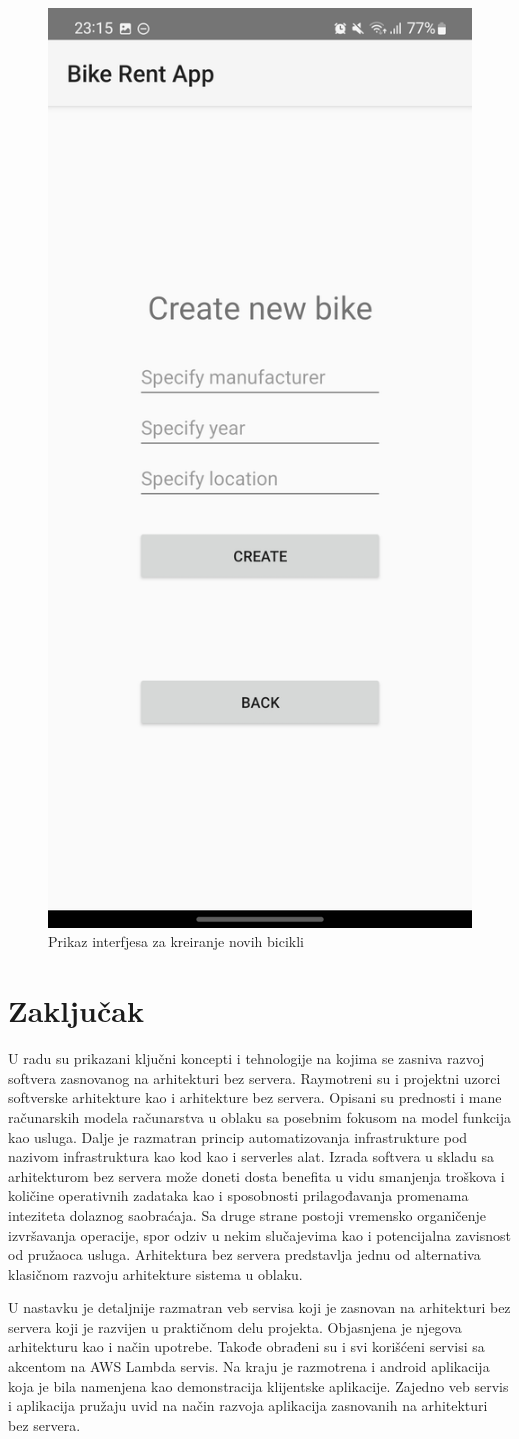 \documentclass[12pt,oneside]{memoir}
\begin{document}
\begin{figure}[!ht]
  \centering
  \includegraphics[height=0.6\textwidth]{Kreiranje nove bicikle.jpg}
  \caption{Prikaz interfjesa za kreiranje novih bicikli}
  \label{fig:kreiranjeNovihBicikli}
\end{figure}


\chapter{Zaključak}

U radu su prikazani ključni koncepti i tehnologije na kojima se zasniva razvoj softvera zasnovanog na arhitekturi bez servera. Raymotreni su i projektni uzorci softverske arhitekture kao i arhitekture bez servera. Opisani su prednosti i mane računarskih modela računarstva u oblaku sa posebnim fokusom na model funkcija kao usluga. Dalje je razmatran princip automatizovanja infrastrukture pod nazivom infrastruktura kao kod kao i serverles alat. Izrada softvera u skladu sa arhitekturom bez servera može doneti dosta benefita u vidu smanjenja troškova i količine operativnih zadataka kao i sposobnosti prilagođavanja promenama inteziteta dolaznog saobraćaja. Sa druge strane postoji vremensko organičenje izvršavanja operacije, spor odziv u nekim slučajevima kao i potencijalna zavisnost od pružaoca usluga. Arhitektura bez servera predstavlja jednu od alternativa klasičnom razvoju arhitekture sistema u oblaku.

U nastavku je detaljnije razmatran veb servisa koji je zasnovan na arhitekturi bez servera koji je razvijen u praktičnom delu projekta. Objasnjena je njegova arhitekturu kao i način upotrebe. Takođe obrađeni su i svi korišćeni servisi sa akcentom na AWS Lambda servis. Na kraju je razmotrena i android aplikacija koja je bila namenjena kao demonstracija klijentske aplikacije. Zajedno veb servis i aplikacija pružaju uvid na način razvoja aplikacija zasnovanih na arhitekturi bez servera. 
\end{document}
